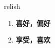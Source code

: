 
\begin{frame}
{\huge relish}
\begin{center}
\begin{enumerate}\Large
  \item \textbf{喜好，偏好}
  \item \textbf{享受，喜欢}
\end{enumerate}
\end{center}
\end{frame}
